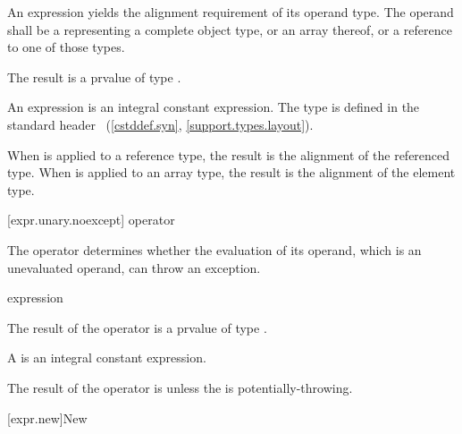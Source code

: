 \pnum
{}%
An  expression yields the alignment requirement
of its operand type. The operand shall be a 
representing a complete object type, or an array thereof, or a reference
to one of those types.

\pnum
The result is a prvalue of type .
\begin{note}
An  expression
is an integral constant expression.
The type  is defined in the standard header
~(\ref{cstddef.syn}, \ref{support.types.layout}).
\end{note}

\pnum
When  is applied to a reference type, the result
is the alignment of the referenced type. When 
is applied to an array type, the result is the alignment of the
element type.

[expr.unary.noexcept]{ operator}

\pnum
{}%
The  operator determines whether the evaluation of its operand,
which is an unevaluated operand, can throw an
exception.

\begin{bnf}
\br
   \terminal{(} expression \terminal{)}
\end{bnf}

\pnum
The result of the  operator is a prvalue of type .
\begin{note}
A 
is an integral constant expression.
\end{note}

\pnum
The result of the  operator is 
unless the  is potentially-throwing.

[expr.new]{New}

